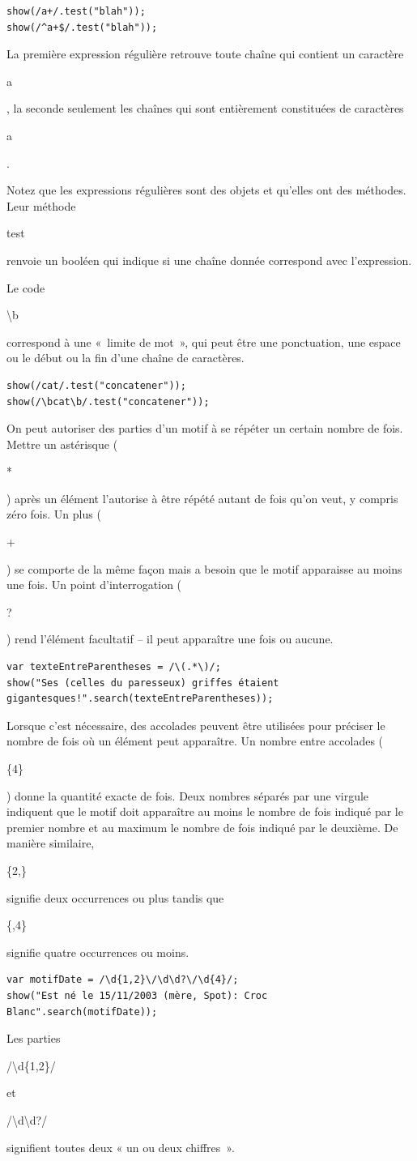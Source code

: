 \documentclass{FramateX}
\renewcommand{\texttt}[1]{\begin{sffamily}{#1}\end{sffamily}}
\begin{document}
\begin{lstlisting}
show(/a+/.test("blah"));
show(/^a+$/.test("blah"));
\end{lstlisting}
La première expression régulière retrouve toute chaîne qui contient un
caractère \texttt{a}, la seconde seulement les chaînes qui sont
entièrement constituées de caractères \texttt{a}.

Notez que les expressions régulières sont des objets et qu'elles ont des
méthodes. Leur méthode \texttt{test} renvoie un booléen qui indique si
une chaîne donnée correspond avec l'expression.

Le code \texttt{\textbackslash{}b} correspond à une «~limite de mot~»,
qui peut être une ponctuation, une espace ou le début ou la fin d'une
chaîne de caractères.

\begin{lstlisting}
show(/cat/.test("concatener"));
show(/\bcat\b/.test("concatener"));
\end{lstlisting}
\begin{center}\end{center}

On peut autoriser des parties d'un motif à se répéter un certain nombre
de fois. Mettre un astérisque (\texttt{*}) après un élément l'autorise à
être répété autant de fois qu'on veut, y compris zéro fois. Un plus
(\texttt{+}) se comporte de la même façon mais a besoin que le motif
apparaisse au moins une fois. Un point d'interrogation (\texttt{?}) rend
l'élément facultatif -- il peut apparaître une fois ou aucune.

\begin{lstlisting}
var texteEntreParentheses = /\(.*\)/;
show("Ses (celles du paresseux) griffes étaient gigantesques!".search(texteEntreParentheses));
\end{lstlisting}
Lorsque c'est nécessaire, des accolades peuvent être utilisées pour
préciser le nombre de fois où un élément peut apparaître. Un nombre
entre accolades (\texttt{\{4\}}) donne la quantité exacte de fois. Deux
nombres séparés par une virgule indiquent que le motif doit apparaître
au moins le nombre de fois indiqué par le premier nombre et au maximum
le nombre de fois indiqué par le deuxième. De manière similaire,
\texttt{\{2,\}} signifie deux occurrences ou plus tandis que
\texttt{\{,4\}} signifie quatre occurrences ou moins.

\begin{lstlisting}
var motifDate = /\d{1,2}\/\d\d?\/\d{4}/;
show("Est né le 15/11/2003 (mère, Spot): Croc Blanc".search(motifDate));
\end{lstlisting}
Les parties \texttt{/\textbackslash{}d\{1,2\}/} et
\texttt{/\textbackslash{}d\textbackslash{}d?/} signifient toutes deux «
un ou deux chiffres~».
\end{document}
